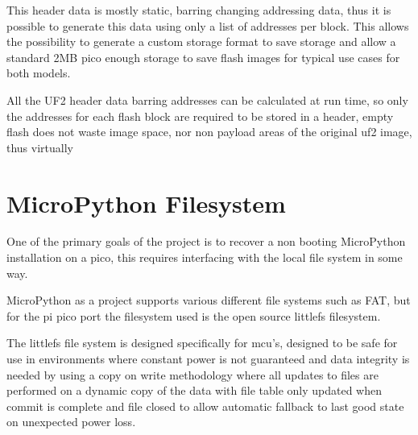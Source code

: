 This header data is mostly static, barring changing addressing data, thus it is possible to generate this data using only a list of addresses per block. This allows the possibility to generate a custom storage format to save storage and allow a standard 2MB pico enough storage to save flash images for typical use cases for both models.

All the UF2 header data barring addresses can be calculated at run time, so only the addresses for each flash block are required to be stored in a header, empty flash does not waste image space, nor non payload areas of the original uf2 image, thus virtually

\pagebreak
\section{MicroPython Filesystem}
One of the primary goals of the project is to recover a non booting MicroPython installation on a pico, this requires interfacing with the local file system in some way.

MicroPython as a project supports various different file systems such as FAT, but for the pi pico port the filesystem used is the open source littlefs filesystem\cite{MicroPythonProject2023}.

The littlefs file system is designed specifically for \gls{mcu}'s, designed to be safe for use in environments where constant power is not guaranteed and data integrity is needed by using a copy on write methodology where all updates to files are performed on a dynamic copy of the data with file table only updated when commit is complete and file closed to allow automatic fallback to last good state on unexpected power loss.





